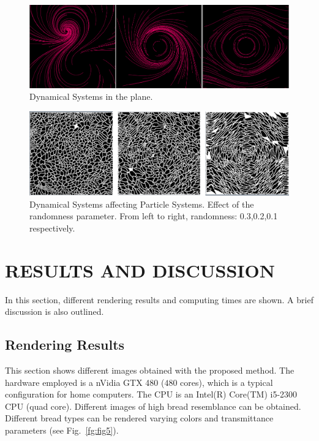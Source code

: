 \documentclass[oneside,a4paper,english,links]{amca}
\begin{document}
\begin{figure}[htb!]
  \centerline{\includegraphics[scale=0.28]{fig3}}
  \caption{Dynamical Systems in the plane.}
  \label{fg:fig3}
\end{figure}


\begin{figure}[htb!]
  \centerline{\includegraphics[scale=0.21]{fig4}}
  \caption{Dynamical Systems affecting Particle Systems. Effect of the randomness parameter. From left to right, randomness: 0.3,0.2,0.1 respectively. }
  \label{fg:fig4}
\end{figure}



\section{RESULTS AND DISCUSSION}

In this section, different rendering results and computing times are shown. A brief discussion is also outlined.

\subsection{Rendering Results}

This section shows different images obtained with the proposed method. The hardware employed is a nVidia GTX 480 ($480$ cores), which is a typical configuration for home computers. The CPU is an Intel(R) Core(TM) i5-2300 CPU (quad core). Different images of high bread resemblance can be obtained. Different bread types can be rendered varying colors and transmittance parameters (see Fig.~\ref{fg:fig5}). 
\end{document}
